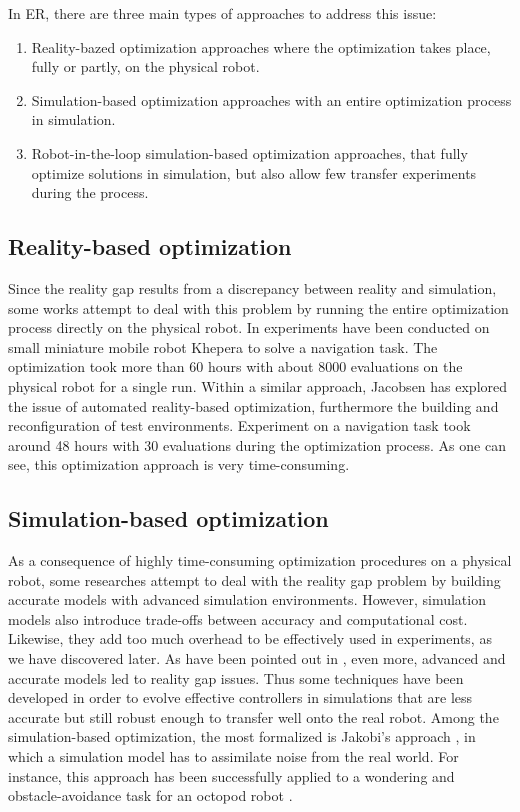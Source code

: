 In ER, there are three main types of approaches to address this issue:

\begin{enumerate}
    \item Reality-bazed optimization approaches where the optimization takes place, fully or partly, on the physical robot.
    \item Simulation-based optimization approaches with an entire optimization process in simulation.
    \item Robot-in-the-loop simulation-based optimization approaches, that fully optimize solutions in simulation, but also allow few transfer experiments during the process.
\end{enumerate}

\subsection{Reality-based optimization}

Since the reality gap results from a discrepancy between reality and simulation, some works attempt to deal with this problem by running the entire optimization process directly on the physical robot. In \citep{floreano1998evolutionary} experiments have been conducted on small miniature mobile robot Khepera \citep{mondada1999development} to solve a navigation task. The optimization took more than 60 hours with about 8000 evaluations on the physical robot for a single run. Within a similar approach, Jacobsen has explored the issue of automated reality-based optimization, furthermore the building and reconfiguration of test environments. Experiment on a navigation task took around 48 hours with 30 evaluations during the optimization process. As one can see, this optimization approach is very time-consuming.

\subsection{Simulation-based optimization}

As a consequence of highly time-consuming optimization procedures on a physical robot, some researches attempt to deal with the reality gap problem by building accurate models with advanced simulation environments. However, simulation models also introduce trade-offs between accuracy and computational cost. Likewise, they add too much overhead to be effectively used in experiments, as we have discovered later. As have been pointed out in \citep{mouret201720}, even more, advanced and accurate models led to reality gap issues. Thus some techniques have been developed in order to evolve effective controllers in simulations that are less accurate but still robust enough to transfer well onto the real robot. Among the simulation-based optimization, the most formalized is Jakobi's approach \citep{jakobi1995noise}, in which a simulation model has to assimilate noise from the real world. For instance, this approach has been successfully applied to a wondering and obstacle-avoidance task for an octopod robot \citep{jakobi1998running}.

